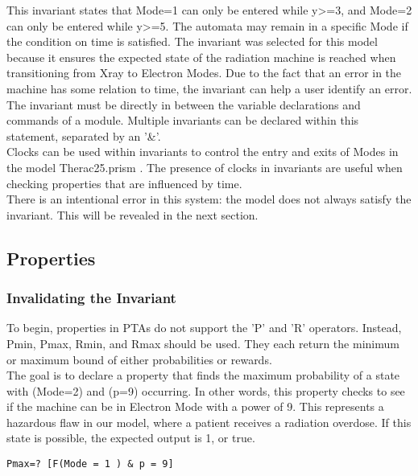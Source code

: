 \documentclass[a4paper]{article}
\begin{document}
This invariant states that Mode=1 can only be entered while y>=3, and Mode=2 can only be entered while y>=5. The automata may remain in a specific Mode if the condition on time is satisfied. The invariant was selected for this model because it ensures the expected state of the radiation machine is reached when transitioning from Xray to Electron Modes. Due to the fact that an error in the machine has some relation to time, the invariant can help a user identify an error. 
\\[1\baselineskip]
The invariant must be directly in between the variable declarations and commands of a module. Multiple invariants can be declared within this statement, separated by an '\&'.
\\[1\baselineskip]
Clocks can be used within invariants to control the entry and exits of Modes in the model Therac25.prism . The presence of clocks in invariants are useful when checking properties that are influenced by time.
\\[1\baselineskip]
There is an intentional error in this system: the model does not always satisfy the invariant. This will be revealed in the next section.


\subsection{Properties}

\subsubsection{Invalidating the Invariant}
To begin, properties in PTAs do not support the 'P' and 'R' operators. Instead, Pmin, Pmax, Rmin, and Rmax should be used. They each return the minimum or maximum bound of either probabilities or rewards.
\\[1\baselineskip]
The goal is to declare a property that finds the maximum probability of a state with (Mode=2) and (p=9) occurring. In other words, this property checks to see if the machine can be in Electron Mode with a power of 9. This represents a hazardous flaw in our model, where a patient receives a radiation overdose. If this state is possible, the expected output is 1, or true.

\begin{lstlisting}
Pmax=? [F(Mode = 1 ) & p = 9]
\end{lstlisting}
\end{document}
